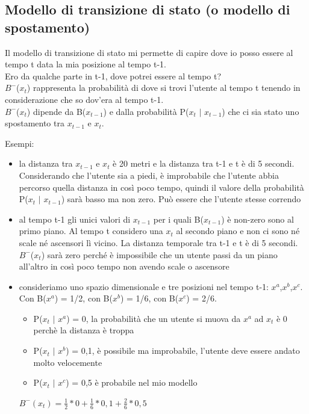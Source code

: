 \subsection{Modello di transizione di stato (o modello di spostamento)}
Il modello di transizione di stato mi permette di capire dove io posso essere al tempo t data la mia posizione al tempo t-1. 
\\Ero da qualche parte in t-1, dove potrei essere al tempo t?
\\$B^-$($x_t$) rappresenta la probabilità di dove si trovi l'utente al tempo t tenendo in considerazione che so dov'era al tempo t-1. 
\\$B^-$($x_t$) dipende da B($x_{t-1}$) e dalla probabilità P($x_t$  $|$ $x_{t-1}$) che ci sia stato uno spostamento tra $x_{t-1}$ e $x_t$. 

Esempi:
\begin{itemize}
    \item la distanza tra $x_{t-1}$ e $x_t$ è 20 metri e la distanza tra t-1 e t è di 5 secondi. Considerando che l'utente sia a piedi, è improbabile che l'utente abbia percorso quella distanza in così poco tempo, quindi il valore della probabilità P($x_t$ $|$ $x_{t-1}$) sarà basso ma non zero. Può essere che l'utente stesse correndo
    \item al tempo t-1 gli unici valori di $x_{t-1}$ per i quali B($x_{t-1}$) è non-zero sono al primo piano. 
    Al tempo t considero una $x_t$ al secondo piano e non ci sono né scale né ascensori lì vicino. La distanza temporale tra t-1 e t è di 5 secondi. $B^-$($x_t$) sarà zero perché è impossibile che un utente passi da un piano all'altro in così poco tempo non avendo scale o ascensore
    \item consideriamo uno spazio dimensionale e tre posizioni nel tempo t-1: $x^a$,$x^b$,$x^c$. 
    \\ Con B($x^a$) = 1/2, con B($x^b$) = 1/6, con B($x^c$) = 2/6.
    \begin{itemize}
        \item P($x_t$ $|$ $x^a$) = 0, la probabilità che un utente si muova da $x^a$ ad $x_t$ è 0 perchè la distanza è troppa 
        \item P($x_t$ $|$ $x^b$) = 0,1, è possibile ma improbabile, l'utente deve essere andato molto velocemente
        \item P($x_t$ $|$ $x^c$) = 0,5 è probabile nel mio modello
    \end{itemize}
    \begin{center}
        \begin{math}
        B^- (x_t) = \frac{1}{2}*0+\frac{1}{6}*0,1+\frac{2}{6}*0,5
        \end{math}
    \end{center}
\end{itemize}
